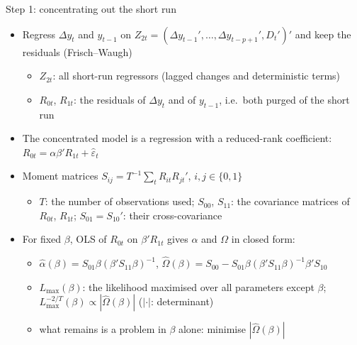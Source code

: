 \begin{frame}{Step 1: concentrating out the short run}
\itemsize{\small}
\begin{itemize}
    \item Regress $\Delta y_t$ and $y_{t-1}$ on $Z_{2t} = (\Delta y_{t-1}', \dots, \Delta y_{t-p+1}', D_t')'$ and keep the residuals (Frisch--Waugh)
    \begin{itemize}
        \item $Z_{2t}$: all short-run regressors (lagged changes and deterministic terms)
        \item $R_{0t}$, $R_{1t}$: the residuals of $\Delta y_t$ and of $y_{t-1}$, i.e.\ both purged of the short run
    \end{itemize}
    \item The concentrated model is a regression with a reduced-rank coefficient: $R_{0t} = \alpha\beta'R_{1t} + \hat\varepsilon_t$
    \item Moment matrices $S_{ij} = T^{-1}\sum_t R_{it}R_{jt}'$, $i, j \in \{0, 1\}$
    \begin{itemize}
        \item $T$: the number of observations used; $S_{00}$, $S_{11}$: the covariance matrices of $R_{0t}$, $R_{1t}$; $S_{01} = S_{10}'$: their cross-covariance
    \end{itemize}
    \item For fixed $\beta$, OLS of $R_{0t}$ on $\beta'R_{1t}$ gives $\alpha$ and $\Omega$ in closed form:
    \begin{itemize}
        \item $\hat\alpha(\beta) = S_{01}\beta(\beta'S_{11}\beta)^{-1}$, $\hat\Omega(\beta) = S_{00} - S_{01}\beta(\beta'S_{11}\beta)^{-1}\beta'S_{10}$
        \item $L_{\max}(\beta)$: the likelihood maximised over all parameters except $\beta$; $L_{\max}^{-2/T}(\beta) \propto |\hat\Omega(\beta)|$ ($|\cdot|$: determinant)
        \item what remains is a problem in $\beta$ alone: minimise $|\hat\Omega(\beta)|$
    \end{itemize}
\end{itemize}
\end{frame}

